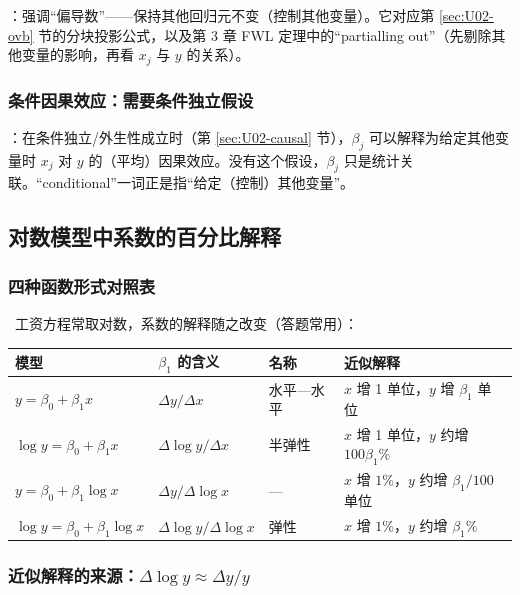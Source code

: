 ：强调“偏导数”——保持其他回归元不变（控制其他变量）。它对应第 \ref{sec:U02-ovb} 节的分块投影公式，以及第 3 章 FWL 定理中的“partialling out”（先剔除其他变量的影响，再看 $x_j$ 与 $y$ 的关系）。

\subsubsection{条件因果效应：需要条件独立假设}

：在条件独立/外生性成立时（第 \ref{sec:U02-causal} 节），$\beta_j$ 可以解释为给定其他变量时 $x_j$ 对 $y$ 的（平均）因果效应。没有这个假设，$\beta_j$ 只是统计关联。“conditional”一词正是指“给定（控制）其他变量”。

\subsection{对数模型中系数的百分比解释}

\subsubsection{四种函数形式对照表}

\tagext\ 工资方程常取对数，系数的解释随之改变（答题常用）：
\begin{center}
\small
\begin{tabularx}{\linewidth}{lllL}
\toprule
模型 & $\beta_1$ 的含义 & 名称 & 近似解释\\
\midrule
$y=\beta_0+\beta_1x$ & $\Delta y/\Delta x$ & 水平—水平 & $x$ 增 1 单位，$y$ 增 $\beta_1$ 单位\\
$\log y=\beta_0+\beta_1x$ & $\Delta\log y/\Delta x$ & 半弹性 & $x$ 增 1 单位，$y$ 约增 $100\beta_1\%$\\
$y=\beta_0+\beta_1\log x$ & $\Delta y/\Delta\log x$ & --- & $x$ 增 $1\%$，$y$ 约增 $\beta_1/100$ 单位\\
$\log y=\beta_0+\beta_1\log x$ & $\Delta\log y/\Delta\log x$ & 弹性 & $x$ 增 $1\%$，$y$ 约增 $\beta_1\%$\\
\bottomrule
\end{tabularx}
\end{center}

\subsubsection{近似解释的来源：\texorpdfstring{$\Delta\log y\approx\Delta y/y$}{Delta log y ≈ Delta y / y}}


